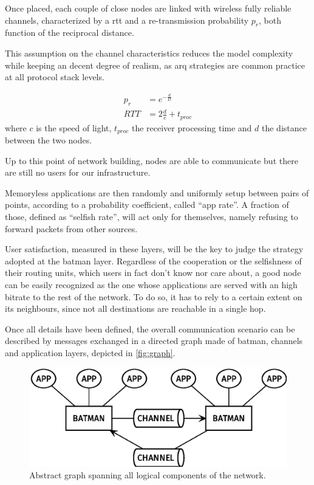 \documentclass[conference]{IEEEtran}
\begin{document}
Once placed, each couple of close nodes are linked with wireless fully reliable channels, characterized by a \gls{rtt} and a re-transmission probability $p_r$, both function of the reciprocal distance.

This assumption on the channel characteristics reduces the model complexity while keeping an decent degree of realism, as \gls{arq} strategies are common practice at all protocol stack levels.

\begin{equation}
  \begin{split}
    p_r & = e^{-\frac{d}{D}} \\
    RTT &= 2 \frac{d}{c} + t_{proc}
  \end{split}
\end{equation}
where $c$ is the speed of light, $t_{proc}$ the receiver processing time and $d$ the distance between the two nodes.
\smallskip

Up to this point of network building, nodes are able to communicate but there are still no users for our infrastructure.

Memoryless applications are then randomly and uniformly setup between pairs of points, according to a probability coefficient, called ``app rate''. A fraction of those, defined as ``selfish rate'', will act only for themselves, namely refusing to forward packets from other sources.

User satisfaction, measured in these layers, will be the key to judge the strategy adopted at the \gls{batman} layer.
Regardless of the cooperation or the selfishness of their routing units, which users in fact don't know nor care about, a good node can be easily recognized as the one whose applications are served with an high bitrate to the rest of the network.
To do so, it has to rely to a certain extent on its neighbours, since not all destinations are reachable in a single hop.

\smallskip
Once all details have been defined, the overall communication scenario can be described by messages exchanged in a directed graph made of \gls{batman}, channels and application layers, depicted in \autoref{fig:graph}.

\begin{figure}[h]
  \centering
  \includegraphics[width=\linewidth]{figures/layers_diagram}
  \caption{Abstract graph spanning all logical components of the network.}
  \label{fig:graph}
\end{figure}
\end{document}
